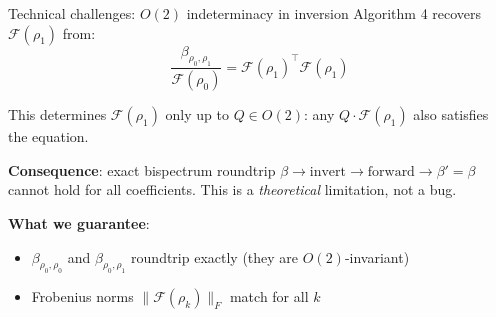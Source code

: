 \documentclass[aspectratio=169]{beamer}
\begin{document}
\begin{frame}{Technical challenges: $O(2)$ indeterminacy in inversion}
  Algorithm 4 recovers $\mathcal{F}(\rho_1)$ from:
  \[
    \frac{\beta_{\rho_0,\rho_1}}{\mathcal{F}(\rho_0)} = \mathcal{F}(\rho_1)^\top \mathcal{F}(\rho_1)
  \]

  This determines $\mathcal{F}(\rho_1)$ only up to $Q \in O(2)$: any $Q \cdot \mathcal{F}(\rho_1)$ also satisfies the equation.

  \bigskip

  \textbf{Consequence}: exact bispectrum roundtrip $\beta \to \text{invert} \to \text{forward} \to \beta' = \beta$ cannot hold for all coefficients. This is a \emph{theoretical} limitation, not a bug.

  \bigskip

  \textbf{What we guarantee}:
  \begin{itemize}
    \item $\beta_{\rho_0,\rho_0}$ and $\beta_{\rho_0,\rho_1}$ roundtrip exactly (they are $O(2)$-invariant)
    \item Frobenius norms $\|\mathcal{F}(\rho_k)\|_F$ match for all $k$
  \end{itemize}
\end{frame}
\end{document}
